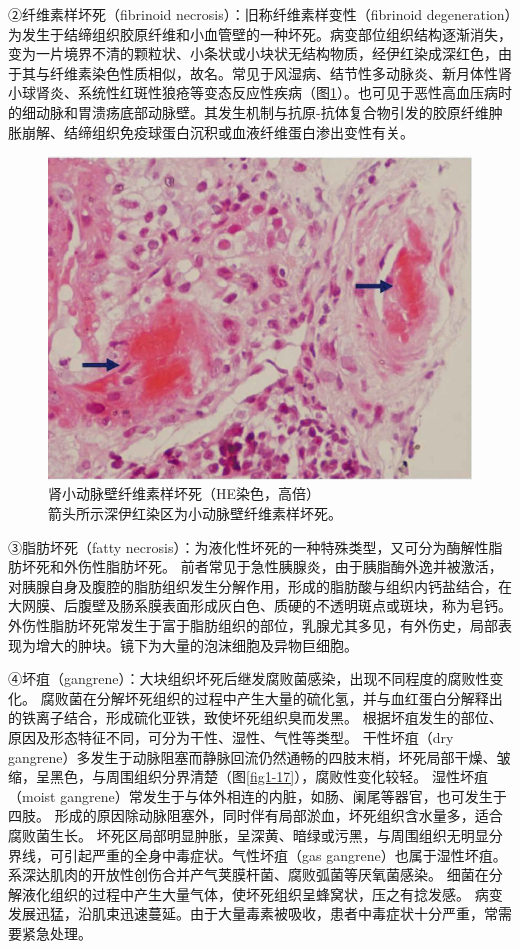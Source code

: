 ②纤维素样坏死（fibrinoid necrosis）：旧称纤维素样变性（fibrinoid
degeneration）为发生于结缔组织胶原纤维和小血管壁的一种坏死。病变部位组织结构逐渐消失，变为一片境界不清的颗粒状、小条状或小块状无结构物质，经伊红染成深红色，由于其与纤维素染色性质相似，故名。常见于风湿病、结节性多动脉炎、新月体性肾小球肾炎、系统性红斑性狼疮等变态反应性疾病（图\ref{fig1-16}）。也可见于恶性高血压病时的细动脉和胃溃疡底部动脉壁。其发生机制与抗原-抗体复合物引发的胶原纤维肿胀崩解、结缔组织免疫球蛋白沉积或血液纤维蛋白渗出变性有关。

\begin{figure}[!htbp]
	\centering
    \includegraphics{./images/Image00017.jpg}
	\caption{肾小动脉壁纤维素样坏死（HE染色，高倍） \\ {\small 箭头所示深伊红染区为小动脉壁纤维素样坏死。}}
	\label{fig1-16} 
    \end{figure} 


③脂肪坏死（fatty
necrosis）：为液化性坏死的一种特殊类型，又可分为酶解性脂肪坏死和外伤性脂肪坏死。
前者常见于急性胰腺炎，由于胰脂酶外逸并被激活，对胰腺自身及腹腔的脂肪组织发生分解作用，形成的脂肪酸与组织内钙盐结合，在大网膜、后腹壁及肠系膜表面形成灰白色、质硬的不透明斑点或斑块，称为皂钙。
外伤性脂肪坏死常发生于富于脂肪组织的部位，乳腺尤其多见，有外伤史，局部表现为增大的肿块。镜下为大量的泡沫细胞及异物巨细胞。

④坏疽（gangrene）：大块组织坏死后继发腐败菌感染，出现不同程度的腐败性变化。
腐败菌在分解坏死组织的过程中产生大量的硫化氢，并与血红蛋白分解释出的铁离子结合，形成硫化亚铁，致使坏死组织臭而发黑。
根据坏疽发生的部位、原因及形态特征不同，可分为干性、湿性、气性等类型。
干性坏疽（dry
gangrene）多发生于动脉阻塞而静脉回流仍然通畅的四肢末梢，坏死局部干燥、皱缩，呈黑色，与周围组织分界清楚（图\ref{fig1-17}），腐败性变化较轻。
湿性坏疽（moist
gangrene）常发生于与体外相连的内脏，如肠、阑尾等器官，也可发生于四肢。
形成的原因除动脉阻塞外，同时伴有局部淤血，坏死组织含水量多，适合腐败菌生长。
坏死区局部明显肿胀，呈深黄、暗绿或污黑，与周围组织无明显分界线，可引起严重的全身中毒症状。气性坏疽（gas
gangrene）也属于湿性坏疽。系深达肌肉的开放性创伤合并产气荚膜杆菌、腐败弧菌等厌氧菌感染。
细菌在分解液化组织的过程中产生大量气体，使坏死组织呈蜂窝状，压之有捻发感。
病变发展迅猛，沿肌束迅速蔓延。由于大量毒素被吸收，患者中毒症状十分严重，常需要紧急处理。

